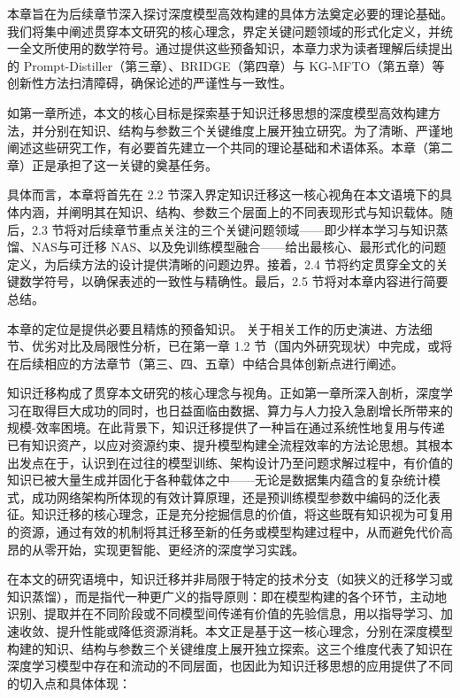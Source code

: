 \documentclass[../main.tex]{subfiles}
\begin{document}
\label{sec:ch2-preliminary}

本章旨在为后续章节深入探讨深度模型高效构建的具体方法奠定必要的理论基础。我们将集中阐述贯穿本文研究的核心理念，界定关键问题领域的形式化定义，并统一全文所使用的数学符号。通过提供这些预备知识，本章力求为读者理解后续提出的 Prompt-Distiller（第三章）、BRIDGE（第四章）与 KG-MFTO（第五章）等创新性方法扫清障碍，确保论述的严谨性与一致性。


如第一章所述，本文的核心目标是探索基于知识迁移思想的深度模型高效构建方法，并分别在知识、结构与参数三个关键维度上展开独立研究。为了清晰、严谨地阐述这些研究工作，有必要首先建立一个共同的理论基础和术语体系。本章（第二章）正是承担了这一关键的奠基任务。

具体而言，本章将首先在 2.2 节深入界定知识迁移这一核心视角在本文语境下的具体内涵，并阐明其在知识、结构、参数三个层面上的不同表现形式与知识载体。随后，2.3 节将对后续章节重点关注的三个关键问题领域——即少样本学习与知识蒸馏、NAS与可迁移 NAS、以及免训练模型融合——给出最核心、最形式化的问题定义，为后续方法的设计提供清晰的问题边界。接着，2.4 节将约定贯穿全文的关键数学符号，以确保表述的一致性与精确性。最后，2.5 节将对本章内容进行简要总结。

本章的定位是提供必要且精炼的预备知识。 关于相关工作的历史演进、方法细节、优劣对比及局限性分析，已在第一章 1.2 节（国内外研究现状）中完成，或将在后续相应的方法章节（第三、四、五章）中结合具体创新点进行阐述。


知识迁移构成了贯穿本文研究的核心理念与视角。正如第一章所深入剖析，深度学习在取得巨大成功的同时，也日益面临由数据、算力与人力投入急剧增长所带来的规模-效率困境。在此背景下，知识迁移提供了一种旨在通过系统性地复用与传递已有知识资产，以应对资源约束、提升模型构建全流程效率的方法论思想。其根本出发点在于，认识到在过往的模型训练、架构设计乃至问题求解过程中，有价值的知识已被大量生成并固化于各种载体之中——无论是数据集内蕴含的复杂统计模式，成功网络架构所体现的有效计算原理，还是预训练模型参数中编码的泛化表征。知识迁移的核心理念，正是充分挖掘信息的价值，将这些既有知识视为可复用的资源，通过有效的机制将其迁移至新的任务或模型构建过程中，从而避免代价高昂的从零开始，实现更智能、更经济的深度学习实践。

在本文的研究语境中，知识迁移并非局限于特定的技术分支（如狭义的迁移学习或知识蒸馏），而是指代一种更广义的指导原则：即在模型构建的各个环节，主动地识别、提取并在不同阶段或不同模型间传递有价值的先验信息，用以指导学习、加速收敛、提升性能或降低资源消耗。本文正是基于这一核心理念，分别在深度模型构建的知识、结构与参数三个关键维度上展开独立探索。这三个维度代表了知识在深度学习模型中存在和流动的不同层面，也因此为知识迁移思想的应用提供了不同的切入点和具体体现：
\end{document}
